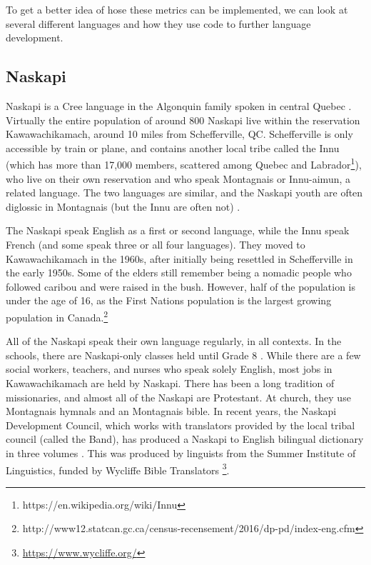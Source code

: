 \documentclass[10pt, a4paper]{article}
\begin{document}
To get a better idea of hose these metrics can be implemented, we can look at several different languages and how they use code to further language development.


\subsection{Naskapi}

Naskapi is a Cree language in the Algonquin family spoken in central Quebec \cite{MacKenzie-and-Jancewicz-1994}. Virtually the entire population of around 800 Naskapi live within the reservation Kawawachikamach, around 10 miles from Schefferville, QC. Schefferville is only accessible by train or plane, and contains another local tribe called the Innu (which has more than 17,000 members, scattered among Quebec and Labrador\footnote{https://en.wikipedia.org/wiki/Innu}), who live on their own reservation and who speak Montagnais or Innu-aimun, a related language. The two languages are similar, and the Naskapi youth are often diglossic in Montagnais (but the Innu are often not) \cite{MacKenzie-1980}.

The Naskapi speak English as a first or second language, while the Innu speak French (and some speak three or all four languages). They moved to Kawawachikamach in the 1960s, after initially being resettled in Schefferville in the early 1950s. Some of the elders still remember being a nomadic people who followed caribou and were raised in the bush. However, half of the population is under the age of 16, as the First Nations population is the largest growing population in Canada.\footnote{http://www12.statcan.gc.ca/census-recensement/2016/dp-pd/index-eng.cfm}

All of the Naskapi speak their own language regularly, in all contexts. In the schools, there are Naskapi-only classes held until Grade 8 \cite{llewellyn2017oral}. While there are a few social workers, teachers, and nurses who speak solely English, most jobs in Kawawachikamach are held by Naskapi. There has been a long tradition of missionaries, and almost all of the Naskapi are Protestant. At church, they use Montagnais hymnals and an Montagnais bible. In recent years, the Naskapi Development Council, which works with translators provided by the local tribal council (called the Band), has produced a Naskapi to English bilingual dictionary in three volumes \cite{MacKenzie-and-Jancewicz-1994}. This was produced by linguists from the Summer Institute of Linguistics, funded by Wycliffe Bible Translators \footnote{\href{https://www.wycliffe.org/}{https://www.wycliffe.org/}}.
\end{document}
